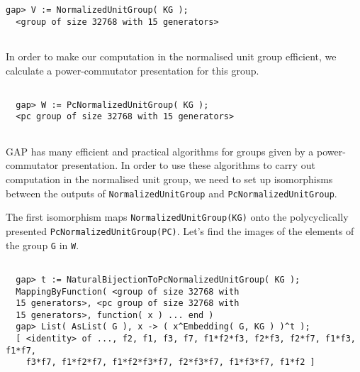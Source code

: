 \documentclass[a4paper,11pt]{report}
\begin{document}
{\begin{Verbatim}[fontsize=\small,frame=single,label=Example]
  gap> V := NormalizedUnitGroup( KG );
  <group of size 32768 with 15 generators>   
  
\end{Verbatim}
 In order to make our computation in the normalised unit group efficient, we
calculate a power-commutator presentation for this group. 
\begin{Verbatim}[fontsize=\small,frame=single,label=Example]
  
  gap> W := PcNormalizedUnitGroup( KG );
  <pc group of size 32768 with 15 generators>
  
\end{Verbatim}
 \textsf{GAP} has many efficient and practical algorithms for groups given by a
power-commutator presentation. In order to use these algorithms to carry out
computation in the normalised unit group, we need to set up isomorphisms
between the outputs of \texttt{NormalizedUnitGroup} and \texttt{PcNormalizedUnitGroup}. 

 The first isomorphism maps \texttt{NormalizedUnitGroup(KG)} onto the polycyclically presented \texttt{PcNormalizedUnitGroup(PC)}. Let's find the images of the elements of the group \texttt{G} in \texttt{W}. 
\begin{Verbatim}[fontsize=\small,frame=single,label=Example]
  
  gap> t := NaturalBijectionToPcNormalizedUnitGroup( KG );
  MappingByFunction( <group of size 32768 with
  15 generators>, <pc group of size 32768 with
  15 generators>, function( x ) ... end )
  gap> List( AsList( G ), x -> ( x^Embedding( G, KG ) )^t );
  [ <identity> of ..., f2, f1, f3, f7, f1*f2*f3, f2*f3, f2*f7, f1*f3, f1*f7,
    f3*f7, f1*f2*f7, f1*f2*f3*f7, f2*f3*f7, f1*f3*f7, f1*f2 ]
  

\end{Verbatim}}
\end{document}
